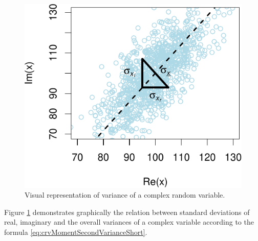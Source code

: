 \documentclass[
]{book}
\begin{document}
\begin{figure}
\centering
\includegraphics{Svetunkov---Svetunkov---Complex-Valued-Econometrics_files/figure-latex/crvMomentSecondVariance-1.pdf}
\caption{\label{fig:crvMomentSecondVariance}Visual representation of variance of a complex random variable.}
\end{figure}

Figure \ref{fig:crvMomentSecondVariance} demonstrates graphically the relation between standard deviations of real, imaginary and the overall variances of a complex variable according to the formula \eqref{eq:crvMomentSecondVarianceShort}.
\end{document}
